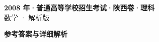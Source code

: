 \documentclass[zihao=-4, a4paper]{ctexart}
\begin{document}
\begin{center}
  {\Large\bfseries 2008 年·普通高等学校招生考试·陕西卷·理科}\\[4pt]
  {\large 数学 · 解析版}
\end{center}
\medskip
{}

\clearpage
{}
\begin{center}{\Large\bfseries 参考答案与详细解析}\end{center}
\medskip

\end{document}
